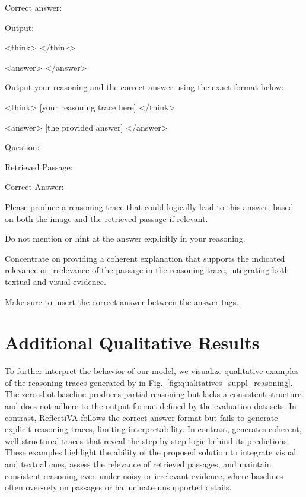\begin{promptbox3}[title={Reasoning Traces Generation System Prompt}]

Correct answer: 


Output:

<think>  </think>

<answer>  </answer>
\newline

Output your reasoning and the correct answer using the exact format below:

<think> [your reasoning trace here] </think>

<answer> [the provided answer] </answer>
\end{promptbox3}


\begin{promptbox3}[title={Reasoning Traces Generation User Prompt}]
\footnotesize
Question: 

Retrieved \textbf{} Passage: 

Correct Answer: 

Please produce a reasoning trace that could logically lead to this answer, based on both the image and the retrieved passage if relevant. 

Do not mention or hint at the answer explicitly in your reasoning.

Concentrate on providing a coherent explanation that supports the indicated relevance or irrelevance of the passage in the reasoning trace, integrating both textual and visual evidence.

Make sure to insert the correct answer between the answer tags.
\end{promptbox3}


\section{Additional Qualitative Results}
\label{supp:qualitatives}


To further interpret the behavior of our model, we visualize qualitative examples of the reasoning traces generated by \ours in Fig.~\ref{fig:qualitatives_suppl_reasoning}. The zero-shot baseline produces partial reasoning but lacks a consistent structure and does not adhere to the output format defined by the evaluation datasets. In contrast, ReflectiVA follows the correct answer format but fails to generate explicit reasoning traces, limiting interpretability. In contrast, \ours generates coherent, well-structured traces that reveal the step-by-step logic behind its predictions. These examples highlight the ability of the proposed solution to integrate visual and textual cues, assess the relevance of retrieved passages, and maintain consistent reasoning even under noisy or irrelevant evidence, where baselines often over-rely on passages or hallucinate unsupported details.


